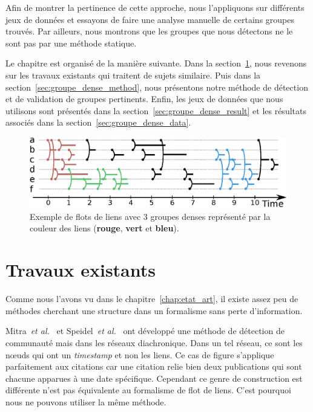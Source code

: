 Afin de montrer la pertinence de cette approche, nous l'appliquons sur différents jeux de données et essayons de faire une analyse manuelle de certains groupes trouvés.
Par ailleurs, nous montrons que les groupes que nous détectons ne le sont pas par une méthode statique.

Le chapitre est organisé de la manière suivante.
Dans la section~\ref{sec:groupe_dense_existant}, nous revenons sur les travaux existants qui traitent de sujets similaire.
Puis dans la section~\ref{sec:groupe_dense_method}, nous présentons notre méthode de détection et de validation de groupes pertinents.
Enfin, les jeux de données que nous utilisons sont présentés dans la section~\ref{sec:groupe_dense_result} et les résultats associés dans la section~\ref{sec:groupe_dense_data}.

\begin{figure}
\centering
\includegraphics[width=\linewidth]{img/GroupeDense/GroupExample/Zone_dense.eps}
\caption{Exemple de flots de liens avec 3 groupes denses représenté par la couleur des liens (\textcolor{brique}{\textbf{rouge}}, \textcolor{vert_turquoise}{\textbf{vert}} et \textcolor{bleu_window}{\textbf{bleu}}).
}
\label{fig:exemple_groupe_dens}
\end{figure}

\section{Travaux existants}
\label{sec:groupe_dense_existant}

Comme nous l'avons vu dans le chapitre~\ref{chap:etat_art}, il existe assez peu de méthodes cherchant une structure dans un formalisme sans perte d'information.

Mitra~\emph{et al.}~\cite{Mitra2012a} et Speidel~\emph{et al.}~\cite{Speidel2015} ont développé une méthode de détection de communauté mais dans les réseaux diachronique.
Dans un tel réseau, ce sont les n\oe uds qui ont un \emph{timestamp} et non les liens.
Ce cas de figure s'applique parfaitement aux citations car une citation relie bien deux publications qui sont chacune apparues à une date spécifique.
Cependant ce genre de construction est différente n'est pas équivalente au formalisme de flot de liens.
C'est pourquoi nous ne pouvons utiliser la même méthode. 

